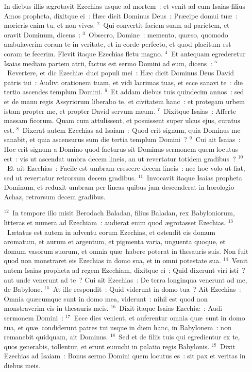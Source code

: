\lettrine[lines=10,image=true,loversize=0.05,lraise=-0.03]{I}{}n diebus illis \ae grotavit Ezechias usque ad mortem~: et venit ad eum Isaias filius Amos propheta, dixitque ei~: H\ae c dicit Dominus Deus~: Pr\ae cipe domui tu\ae~: morieris enim tu, et non vives.
${}^{2}$~Qui convertit faciem suam ad parietem, et oravit Dominum, dicens~:
${}^{3}$~Obsecro, Domine~: memento, qu\ae so, quomodo ambulaverim coram te in veritate, et in corde perfecto, et quod placitum est coram te fecerim. Flevit itaque Ezechias fletu magno.
${}^{4}$~Et antequam egrederetur Isaias mediam partem atrii, factus est sermo Domini ad eum, dicens~:
${}^{5}$~Revertere, et dic Ezechi\ae\ duci populi mei~: H\ae c dicit Dominus Deus David patris tui~: Audivi orationem tuam, et vidi lacrimas tuas, et ecce sanavi te~: die tertio ascendes templum Domini.
${}^{6}$~Et addam diebus tuis quindecim annos~: sed et de manu regis Assyriorum liberabo te, et civitatem hanc~: et protegam urbem istam propter me, et propter David servum meum.
${}^{7}$~Dixitque Isaias~: Afferte massam ficorum. Quam cum attulissent, et posuissent super ulcus ejus, curatus est.
${}^{8}$~Dixerat autem Ezechias ad Isaiam~: Quod erit signum, quia Dominus me sanabit, et quia ascensurus sum die tertia templum Domini~?
${}^{9}$~Cui ait Isaias~: Hoc erit signum a Domino quod facturus sit Dominus sermonem quem locutus est~: vis ut ascendat umbra decem lineis, an ut revertatur totidem gradibus~?
${}^{10}$~Et ait Ezechias~: Facile est umbram crescere decem lineis~: nec hoc volo ut fiat, sed ut revertatur retrorsum decem gradibus.
${}^{11}$~Invocavit itaque Isaias propheta Dominum, et reduxit umbram per lineas quibus jam descenderat in horologio Achaz, retrorsum decem gradibus.


${}^{12}$~In tempore illo misit Berodach Baladan, filius Baladan, rex Babyloniorum, litteras et munera ad Ezechiam~: audierat enim quod \ae grotasset Ezechias.
${}^{13}$~L\ae tatus est autem in adventu eorum Ezechias, et ostendit eis domum aromatum, et aurum et argentum, et pigmenta varia, unguenta quoque, et domum vasorum suorum, et omnia qu\ae\ habere poterat in thesauris suis. Non fuit quod non monstraret eis Ezechias in domo sua, et in omni potestate sua.
${}^{14}$~Venit autem Isaias propheta ad regem Ezechiam, dixitque ei~: Quid dixerunt viri isti~? aut unde venerunt ad te~? Cui ait Ezechias~: De terra longinqua venerunt ad me, de Babylone.
${}^{15}$~At ille respondit~: Quid viderunt in domo tua~? Ait Ezechias~: Omnia qu\ae cumque sunt in domo mea, viderunt~: nihil est quod non monstraverim eis in thesauris meis.
${}^{16}$~Dixit itaque Isaias Ezechi\ae~: Audi sermonem Domini~:
${}^{17}$~Ecce dies venient, et auferentur omnia qu\ae\ sunt in domo tua, et qu\ae\ condiderunt patres tui usque in diem hanc, in Babylonem~: non remanebit quidquam, ait Dominus.
${}^{18}$~Sed et de filiis tuis qui egredientur ex te, quos generabis, tollentur, et erunt eunuchi in palatio regis Babylonis.
${}^{19}$~Dixit Ezechias ad Isaiam~: Bonus sermo Domini quem locutus es~: sit pax et veritas in diebus meis.


